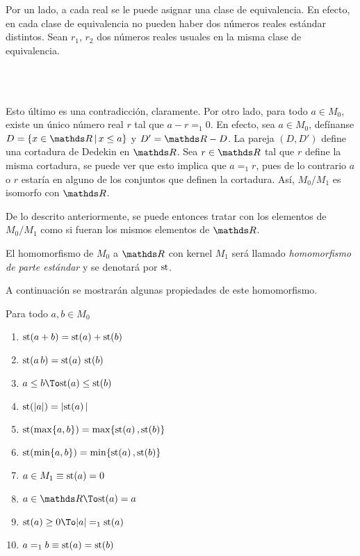 \begin{demo}
  Por un lado, a cada real se le puede asignar una clase de
  equivalencia. En efecto, en cada clase de equivalencia no pueden
  haber dos números reales estándar distintos. Sean $r_1$, $r_2$ dos
  números reales usuales en la misma clase de equivalencia.
  \begin{longderivation}
      \\
    \To\\
  \end{longderivation}
  Esto último es una contradicción, claramente. Por otro lado, para todo
  $a\in M_0$, existe un único número real $r$ tal que $a-r=_1 0$. En
  efecto, sea $a\in M_0$, defínanse $D=\set{x\in\R}{x \leq a}$ y
  $D'=\R - D$. La pareja $(D,D')$ define una cortadura de Dedekin en $\R$.
  Sea $r\in\R$ tal que $r$ define la misma cortadura, se puede ver que
  esto implica que $a=_1 r$, pues de lo contrario $a$ o $r$ estaría en
  alguno de los conjuntos que definen la cortadura. Así, $M_0/M_1$ es
  isomorfo con $\R$.
\end{demo}

De lo descrito anteriormente, se puede entonces tratar con los
elementos de $M_0/M_1$ como si fueran los mismos elementos de $\R$.

\begin{definition}
  El homomorfismo de $M_0$ a $\R$ con kernel $M_1$ será llamado
  \emph{homomorfismo de parte estándar} y se denotará por $\mathrm{s\hspace{-0.25pt}t}$.
\end{definition}

A continuación se mostrarán algunas propiedades de este homomorfismo.

\begin{lemma}[Propiedades] Para todo $a,b\in M_0$
  \begin{enumerate}
    \item $\mathrm{s\hspace{-0.25pt}t}\!\left(a+b\right) = \mathrm{s\hspace{-0.25pt}t}\!\left(a\right) + \mathrm{s\hspace{-0.25pt}t}\!\left(b\right)$
    \item $\mathrm{s\hspace{-0.25pt}t}\!\left(a\,b\right) = \mathrm{s\hspace{-0.25pt}t}\!\left(a\right)\,\mathrm{s\hspace{-0.25pt}t}\!\left(b\right)$
    \item $a \leq b \To \sd{a} \leq \sd{b}$
    \item $\mathrm{s\hspace{-0.25pt}t}\!\left(|a|\right) = |\mathrm{s\hspace{-0.25pt}t}\!\left(a\right)|$
    \item $\mathrm{s\hspace{-0.25pt}t}\!\left(\max\{a,b\}\right) = \max\{\mathrm{s\hspace{-0.25pt}t}\!\left(a\right),\mathrm{s\hspace{-0.25pt}t}\!\left(b\right)\}$
    \item $\mathrm{s\hspace{-0.25pt}t}\!\left(\min\{a,b\}\right) = \min\{\mathrm{s\hspace{-0.25pt}t}\!\left(a\right),\mathrm{s\hspace{-0.25pt}t}\!\left(b\right)\}$
    \item $a\in M_1 \equiv \mathrm{s\hspace{-0.25pt}t}\!\left(a\right) = 0$
    \item $a\in\R \To \sd{a} = a$
    \item $\sd{a} \geq 0 \To |a| =_1 \sd{a}$
    \item $a=_1 b \equiv \mathrm{s\hspace{-0.25pt}t}\!\left(a\right) = \mathrm{s\hspace{-0.25pt}t}\!\left(b\right)$
  \end{enumerate}
\end{lemma}

